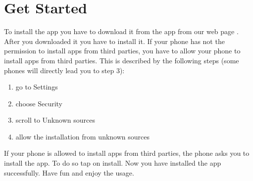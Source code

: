\documentclass[11pt, accentcolor=tud1c]{tudreport}
\begin{document}
\section{Get Started}
To install the app you have to download it from the app from our web page \cite{app}. After you downloaded it you have to install it. If your phone has not the permission to install apps from third parties, you have to allow your phone to install apps from third parties. This is described by the following steps (some phones will directly lead you to step 3):
\begin{enumerate}
\item go to Settings
\item choose Security
\item scroll to Unknown sources
\item allow the installation from unknown sources
\end{enumerate} 
If your phone is allowed to install apps from third parties, the phone asks you to install the app. To do so tap on install. Now you have installed the app successfully. Have fun and enjoy the usage.
\end{document}

